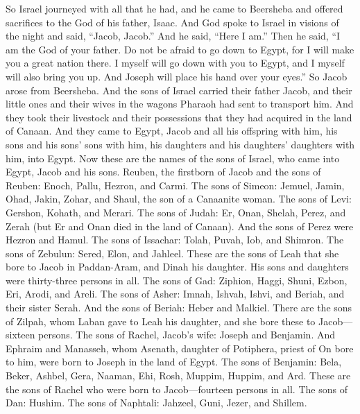 \begin{biblechapter} %
 So Israel journeyed with all that he had, and he came to Beersheba and offered sacrifices to the God of his father, Isaac.
\verse And God spoke to Israel in visions of the night and said, “Jacob, Jacob.” And he said, “Here I am.”
\verse Then he said, “I am the God of your father. Do not be afraid to go down to Egypt, for I will make you a great nation there.
\verse I myself will go down with you to Egypt, and I myself will also bring you up. And Joseph will place his hand over your eyes.”
\verse So Jacob arose from Beersheba. And the sons of Israel carried their father Jacob, and their little ones and their wives in the wagons Pharaoh had sent to transport him.
\verse And they took their livestock and their possessions that they had acquired in the land of Canaan. And they came to Egypt, Jacob and all his offspring with him,
\verse his sons and his sons’ sons with him, his daughters and his daughters’ daughters with him, into Egypt.
\verse Now these are the names of the sons of Israel, who came into Egypt, Jacob and his sons. Reuben, the firstborn of Jacob
\verse and the sons of Reuben: Enoch, Pallu, Hezron, and Carmi.
\verse The sons of Simeon: Jemuel, Jamin, Ohad, Jakin, Zohar, and Shaul, the son of a Canaanite woman.
\verse The sons of Levi: Gershon, Kohath, and Merari.
\verse The sons of Judah: Er, Onan, Shelah, Perez, and Zerah (but Er and Onan died in the land of Canaan). And the sons of Perez were Hezron and Hamul.
\verse The sons of Issachar: Tolah, Puvah, Iob, and Shimron.
\verse The sons of Zebulun: Sered, Elon, and Jahleel.
\verse These are the sons of Leah that she bore to Jacob in Paddan-Aram, and Dinah his daughter. His sons and daughters were thirty-three persons in all.
\verse The sons of Gad: Ziphion, Haggi, Shuni, Ezbon, Eri, Arodi, and Areli.
\verse The sons of Asher: Imnah, Ishvah, Ishvi, and Beriah, and their sister Serah. And the sons of Beriah: Heber and Malkiel.
\verse There are the sons of Zilpah, whom Laban gave to Leah his daughter, and she bore these to Jacob—sixteen persons.
\verse The sons of Rachel, Jacob’s wife: Joseph and Benjamin.
\verse And Ephraim and Manasseh, whom Asenath, daughter of Potiphera, priest of On bore to him, were born to Joseph in the land of Egypt.
\verse The sons of Benjamin: Bela, Beker, Ashbel, Gera, Naaman, Ehi, Rosh, Muppim, Huppim, and Ard.
\verse These are the sons of Rachel who were born to Jacob—fourteen persons in all.
\verse The sons of Dan: Hushim.
\verse The sons of Naphtali: Jahzeel, Guni, Jezer, and Shillem.

\end{biblechapter}
